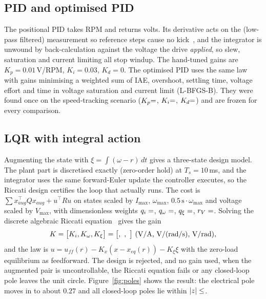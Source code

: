 \documentclass[10pt,a4paper]{article}
\makeatletter
\newcommand{\Lw}[1]{\csname L@#1\endcsname}
\newcommand{\Gp}[1]{\csname G@#1\endcsname}
\makeatother
\begin{document}
\subsection{PID and optimised PID}
The positional PID takes RPM and returns volts. Its derivative acts on the (low-pass filtered) measurement so reference steps cause no kick~\cite{ah2006}, and the
integrator is unwound by back-calculation against the voltage the drive \emph{applied}, so slew, saturation and current limiting all stop windup.
The hand-tuned gains are $K_p{=}0.01$\,V/RPM, $K_i{=}0.03$, $K_d{=}0$. The optimised PID uses the same law with gains minimising a weighted sum of IAE,
overshoot, settling time, voltage effort and time in voltage saturation and current limit (L-BFGS-B). They were found once on the
speed-tracking scenario ($K_p{=}\Gp{kp}$, $K_i{=}\Gp{ki}$, $K_d{=}\Gp{kd}$) and are frozen for every comparison.

\subsection{LQR with integral action}
Augmenting the state with $\xi=\int(\omega-r)\,dt$ gives a three-state design model. The plant part is discretised exactly (zero-order hold) at
$T_s=10$\,ms, and the integrator uses the same forward-Euler update the controller executes, so the Riccati design certifies the loop that actually runs.
The cost is $\sum x_{aug}^\top Qx_{aug}+u^\top Ru$ on states scaled by $I_{\max}$, $\omega_{\max}$, $0.5\,\mathrm{s}\cdot\omega_{\max}$ and voltage scaled by $V_{\max}$,
with dimensionless weights $q_i=\Lw{q_current}$, $q_\omega=\Lw{q_speed}$, $q_\xi=\Lw{q_integral}$, $r_V=\Lw{r_voltage}$.
Solving the discrete algebraic Riccati equation~\cite{am1990} gives the gain
\begin{equation}
K=\bigl[K_i,K_\omega,K_\xi\bigr]=\bigl[\Lw{KI},\ \Lw{KW},\ \Lw{KX}\bigr]\ \text{(V/A, V/(rad/s), V/rad)},
\end{equation}
and the law is $u=u_{ff}(r)-K_x(x-x_{eq}(r))-K_\xi\xi$ with the zero-load equilibrium as feedforward. The design is rejected, and no gain used, when the augmented
pair is uncontrollable, the Riccati equation fails or any closed-loop pole leaves the unit circle. Figure~\ref{fig:poles} shows the result: the electrical
pole moves in to about $0.27$ and all closed-loop poles lie within $|z|\le\Lw{maxpole}$.
\end{document}
